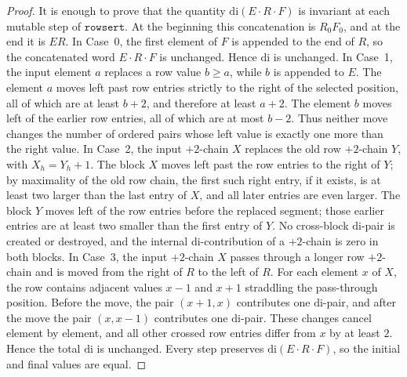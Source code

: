 \documentclass[11pt]{article}
\theoremstyle{plain}
\theoremstyle{definition}
\theoremstyle{remark}
\newcommand{\di}{\mathrm{di}}
\newcommand{\rowsert}{\texttt{rowsert}}
\begin{document}
\begin{proof}
It is enough to prove that the quantity \(\di(E\cdot R\cdot F)\) is invariant
at each mutable step of \(\rowsert\).  At the beginning this concatenation is
\(R_0F_0\), and at the end it is \(ER\).
In Case~0, the first element of \(F\) is appended to the end of \(R\), so the
concatenated word \(E\cdot R\cdot F\) is unchanged.  Hence \(\di\) is
unchanged.
In Case~1, the input element \(a\) replaces a row value \(b\ge a\), while \(b\)
is appended to \(E\).  The element \(a\) moves left past row entries strictly to
the right of the selected position, all of which are at least \(b+2\), and
therefore at least \(a+2\).  The element \(b\) moves left of the earlier row
entries, all of which are at most \(b-2\).  Thus neither move changes the number
of ordered pairs whose left value is exactly one more than the right value.
In Case~2, the input \(+2\)-chain \(X\) replaces the old row \(+2\)-chain \(Y\),
with \(X_h=Y_h+1\).  The block \(X\) moves left past the row entries to the
right of \(Y\); by maximality of the old row chain, the first such right entry,
if it exists, is at least two larger than the last entry of \(X\), and all later
entries are even larger.  The block \(Y\) moves left of the row entries before
the replaced segment; those earlier entries are at least two smaller than the
first entry of \(Y\).  No cross-block \(\di\)-pair is created or destroyed, and
the internal \(\di\)-contribution of a \(+2\)-chain is zero in both blocks.
In Case~3, the input \(+2\)-chain \(X\) passes through a longer row \(+2\)-chain
and is moved from the right of \(R\) to the left of \(R\).  For each element
\(x\) of \(X\), the row contains adjacent values \(x-1\) and \(x+1\) straddling
the pass-through position.  Before the move, the pair \((x+1,x)\) contributes
one \(\di\)-pair, and after the move the pair \((x,x-1)\) contributes one
\(\di\)-pair.  These changes cancel element by element, and all other crossed
row entries differ from \(x\) by at least \(2\).  Hence the total \(\di\) is
unchanged.
Every step preserves \(\di(E\cdot R\cdot F)\), so the initial and final values
are equal.
\end{proof}


\end{document}
